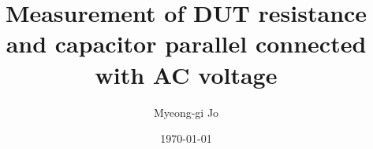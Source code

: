 \documentclass[12pt]{article}
\begin{document}
\title[Intermediate Physics Experiment 2, Module 1]{Measurement of DUT resistance and capacitor parallel connected with AC voltage}
\author{Myeong-gi Jo}

\date{\today}

\maketitle
\end{document}
